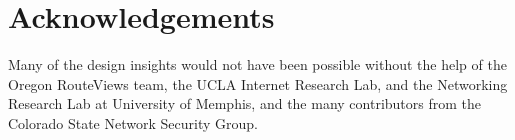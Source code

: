 \section{Acknowledgements}
\label{sec:ack}
Many of the design insights  would not have been possible without the help of the Oregon RouteViews team, the UCLA Internet Research Lab, and the Networking Research Lab at University of Memphis, and the many contributors from the Colorado State Network Security Group. 


